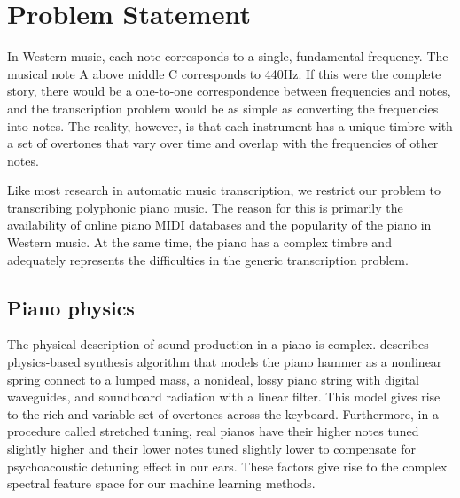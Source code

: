 \documentclass[5p]{elsarticle}
\begin{document}













\section{Problem Statement}

In Western music, each note corresponds to a single, fundamental frequency. The musical note A above middle C corresponds to 440Hz. If this were the complete story, there would be a one-to-one correspondence between frequencies and notes, and the transcription problem would be as simple as converting the frequencies into notes. The reality, however, is that each instrument has a unique timbre with a set of overtones that vary over time and overlap with the frequencies of other notes.

Like most research in automatic music transcription, we restrict our problem to transcribing polyphonic piano music. The reason for this is primarily the availability of online piano MIDI databases and the popularity of the piano in Western music. At the same time, the piano has a complex timbre and adequately represents the difficulties in the generic transcription problem.

\subsection{Piano physics}

The physical description of sound production in a piano is complex. \citet{bank2003physically} describes physics-based synthesis algorithm that models the piano hammer as a nonlinear spring connect to a lumped mass, a nonideal, lossy piano string with digital waveguides, and soundboard radiation with a linear filter. This model gives rise to the rich and variable set of overtones across the keyboard. Furthermore, in a procedure called stretched tuning, real pianos have their higher notes tuned slightly higher and their lower notes tuned slightly lower to compensate for psychoacoustic detuning effect in our ears. These factors give rise to the complex spectral feature space for our machine learning methods.
\end{document}
